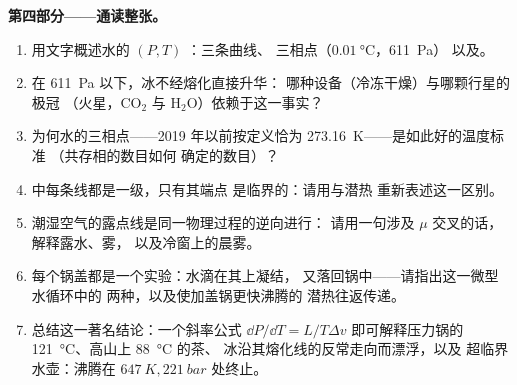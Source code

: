\begin{problem}
\medskip\noindent\textbf{第四部分——通读整张。}
\begin{enumerate}[resume]
  \item 用文字概述水的 $(P, T)$ ：三条曲线、
        三相点（$\qty{0.01}{\celsius}$，\qty{611}{Pa}）
        以及。
  \item 在 \qty{611}{Pa} 以下，冰不经熔化直接升华：
        哪种设备（冷冻干燥）与哪颗行星的极冠
        （火星，CO$_2$ 与 H$_2$O）依赖于这一事实？
  \item 为何水的三相点——2019 年以前按定义恰为
        \qty{273.16}{K}——是如此好的温度标准
        （共存相的数目如何
        确定的数目）？
  \item {}中每条线都是一级，只有其端点
        是临界的：请用与潜热
        重新表述这一区别。
  \item 潮湿空气的露点线是同一物理过程的逆向进行：
        请用一句涉及 $\mu$ 交叉的话，解释露水、雾，
        以及冷窗上的晨雾。
  \item 每个锅盖都是一个实验：水滴在其上凝结，
        又落回锅中——请指出这一微型水循环中的
        两种，以及使加盖锅更快沸腾的
        潜热往返传递。
  \item 总结这一著名结论：一个斜率公式 $\dd P/
        \dd T = L/T\Delta v$ 即可解释压力锅的
        \qty{121}{\celsius}、高山上 \qty{88}{\celsius} 的茶、
        冰沿其熔化线的反常走向而漂浮，以及
        超临界水壶：沸腾在
        $\qty{647}{K}, \qty{221}{bar}$ 处终止。
\end{enumerate}
\end{problem}
